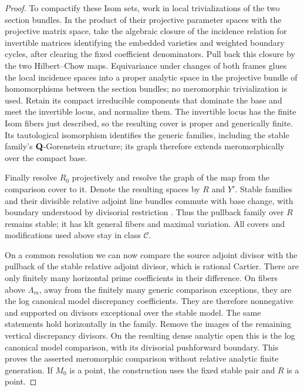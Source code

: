 \begin{proof}
To compactify these Isom sets, work in local trivializations of the
two section bundles. In the product of their projective parameter
spaces with the projective matrix space, take the algebraic closure
of the incidence relation for invertible matrices identifying the
embedded varieties and weighted boundary cycles, after clearing the
fixed coefficient denominators. Pull back this closure by the two
Hilbert--Chow maps. Equivariance under changes of both frames glues
the local incidence spaces into a proper analytic space in the
projective bundle of homomorphisms between the section bundles; no
meromorphic trivialization is used. Retain its compact irreducible
components that dominate the base and meet the invertible locus,
and normalize them. The invertible locus has the finite Isom fibers
just described, so the resulting cover is proper and generically
finite. Its tautological isomorphism identifies the generic families,
including the stable family's \(\mathbf Q\)-Gorenstein structure; its graph
therefore extends meromorphically over the compact base.

Finally resolve \(R_0\) projectively and resolve the graph of the
map from the comparison cover to it.  Denote the resulting spaces
by \(R\) and \(Y'\).  Stable families and their divisible relative
adjoint line bundles commute with base change, with boundary understood
by divisorial restriction \cite[Remark~3.8]{KovacsPatakfalvi}.
Thus the pullback family over \(R\) remains stable; it has klt general
fibers and maximal variation.  All covers and modifications used above stay
in class \(\mathcal C\).

On a common resolution we can now compare the source adjoint
divisor with the pullback of the stable relative adjoint divisor,
which is rational Cartier.  There are only finitely many horizontal
prime coefficients in their difference.  On fibers above
\(\Lambda_m\), away from the finitely many generic comparison
exceptions, they are the log canonical model discrepancy coefficients.
They are therefore nonnegative and supported on divisors exceptional
over the stable model.  The same statements hold horizontally in
the family.  Remove the images of the remaining vertical discrepancy
divisors.  On the resulting dense analytic open this is the log
canonical model comparison, with its divisorial pushforward boundary.
This proves the asserted meromorphic comparison without relative
analytic finite generation.  If \(M_0\) is a point, the construction
uses the fixed stable pair and \(R\) is a point.
\end{proof}

